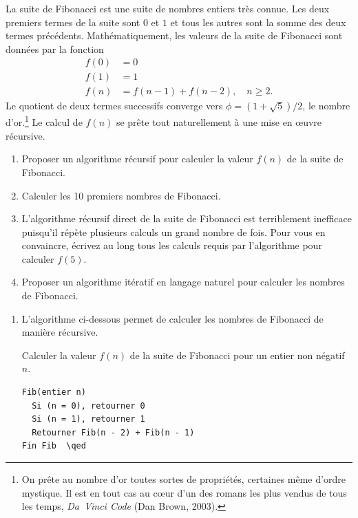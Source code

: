 \begin{exercice}
  La suite de Fibonacci est une suite de
  nombres entiers très connue. Les deux premiers termes de la suite
  sont $0$ et $1$ et tous les autres sont la somme des deux termes
  précédents. Mathématiquement, les valeurs de la suite de Fibonacci
  sont données par la fonction
  \begin{align*}
    f(0) &= 0 \\
    f(1) &= 1 \\
    f(n) & = f(n - 1) + f(n - 2), \quad n \geq 2.
  \end{align*}
  Le quotient de deux termes successifs converge vers
  $\phi = (1 + \sqrt{5})/2$, le nombre d'or.\footnote{%
    On prête au nombre d'or toutes sortes de propriétés, certaines
    même d'ordre mystique. Il est en tout cas au cœur d'un des romans
    les plus vendus de tous les temps, \emph{Da~Vinci Code} (Dan
    Brown, 2003).} %
  Le calcul de $f(n)$ se prête tout naturellement à une mise en œuvre
  récursive.
  \begin{enumerate}
  \item Proposer un algorithme récursif pour calculer la valeur $f(n)$
    de la suite de Fibonacci.
  \item Calculer les 10 premiers nombres de Fibonacci.
  \item L'algorithme récursif direct de la suite de Fibonacci est
    terriblement inefficace puisqu'il répète plusieurs calculs un
    grand nombre de fois. Pour vous en convaincre, écrivez au long
    tous les calculs requis par l'algorithme pour calculer $f(5)$.
  \item Proposer un algorithme itératif en langage naturel pour
    calculer les nombres de Fibonacci.
  \end{enumerate}
  \begin{sol}
    \begin{enumerate}
    \item L'algorithme ci-dessous permet de calculer les nombres de
      Fibonacci de manière récursive.
      \begin{algorithme*}
        Calculer la valeur $f(n)$ de la suite de
        Fibonacci pour un entier non négatif $n$.
        \begin{pseudocode}
\begin{Verbatim}[commandchars=\\\{\}]
Fib(entier n)
  Si (n = 0), retourner 0
  Si (n = 1), retourner 1
  Retourner Fib(n - 2) + Fib(n - 1)
Fin Fib  \qed

\end{Verbatim}
\end{pseudocode}
\end{algorithme*}
\end{enumerate}
\end{sol}
\end{exercice}
